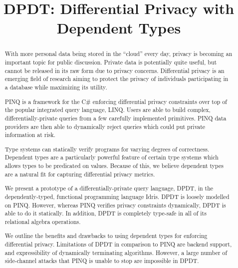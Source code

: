 \documentclass[12pt]{report}
\title{DPDT: Differential Privacy with Dependent Types}
\begin{document}
\maketitle


\graphicspath{{assets/}}

\begin{abstract}
With more personal data being stored in the ``cloud'' every day, privacy is becoming an important topic for public discussion.
Private data is potentially quite useful, but cannot be released in its raw form due to privacy concerns.
Differential privacy is an emerging field of research aiming to protect the privacy of individuals participating in a database while maximizing its utility.

PINQ is a framework for the C\# enforcing differential privacy constraints over top of the popular integrated query language, LINQ.
Users are able to build complex, differentially-private queries from a few carefully implemented primitives.
PINQ data providers are then able to dynamically reject queries which could put private information at risk.

Type systems can statically verify programs for varying degrees of correctness.
Dependent types are a particularly powerful feature of certain type systems which allows types to be predicated on values.
Because of this, we believe dependent types are a natural fit for capturing differential privacy metrics.

We present a prototype of a differentially-private query language, DPDT, in the dependently-typed, functional programming language Idris.
DPDT is loosely modelled on PINQ.
However, whereas PINQ verifies privacy constraints dynamically, DPDT is able to do it statically.
In addition, DPDT is completely type-safe in all of its relational algebra operations.

We outline the benefits and drawbacks to using dependent types for enforcing differential privacy.
Limitations of DPDT in comparison to PINQ are backend support, and expressibility of dynamically terminating algorithms.
However, a large number of side-channel attacks that PINQ is unable to stop are impossible in DPDT.
\end{abstract}

\clearpage
\tableofcontents
\clearpage
\listoffigures
\clearpage
\end{document}
